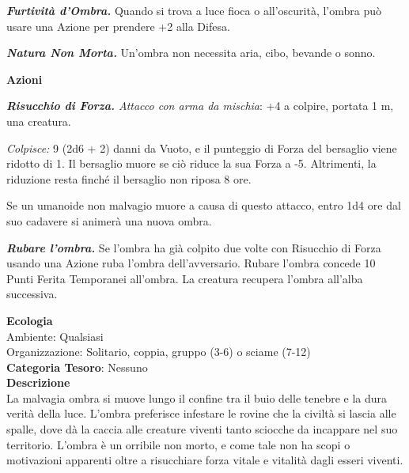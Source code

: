 \begin{multicols}{2}
{\emph{\textbf{Furtività d'Ombra.}} Quando si trova a luce fioca o all'oscurità, l'ombra può usare una Azione per prendere +2 alla Difesa.

\emph{\textbf{Natura Non Morta.}} Un'ombra non necessita aria, cibo, bevande o sonno.

\textbf{Azioni}

\emph{\textbf{Risucchio di Forza.} Attacco con arma da mischia}: +4 a colpire, portata 1 m, una creatura.

\emph{Colpisce:} 9 (2d6 + 2) danni da Vuoto, e il punteggio di Forza del bersaglio viene ridotto di 1. Il bersaglio muore se ciò riduce la sua Forza a -5. Altrimenti, la riduzione resta finché il bersaglio non riposa 8 ore.

Se un umanoide non malvagio muore a causa di questo attacco, entro 1d4 ore dal suo cadavere si animerà una nuova ombra.

\emph{\textbf{Rubare l'ombra.}} Se l'ombra ha già colpito due volte con Risucchio di Forza usando una Azione ruba l'ombra dell'avversario. Rubare l'ombra concede 10 Punti Ferita Temporanei all'ombra. La creatura recupera l'ombra all'alba successiva.

\textbf{Ecologia}\\
Ambiente: Qualsiasi\\
Organizzazione: Solitario, coppia, gruppo (3-6) o sciame (7-12)\\
\textbf{Categoria Tesoro}: Nessuno\\
\textbf{Descrizione}\\
La malvagia ombra si muove lungo il confine tra il buio delle tenebre e la dura verità della luce. L'ombra preferisce infestare le rovine che la civiltà si lascia alle spalle, dove dà la caccia alle creature viventi tanto sciocche da incappare nel suo territorio. L'ombra è un orribile non morto, e come tale non ha scopi o motivazioni apparenti oltre a risucchiare forza vitale e vitalità dagli esseri viventi.

}
\end{multicols}

